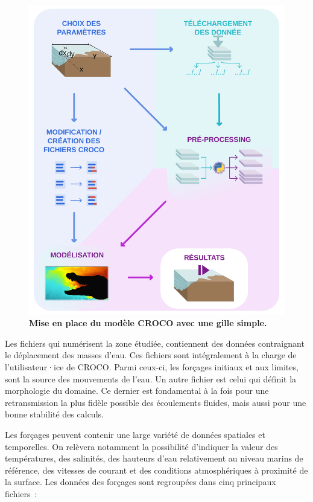 \documentclass[10pt,a4paper,titlepage]{article}
\begin{document}
\begin{figure}[h!]
    \centering
    \includegraphics[scale=0.35]{../images/workflow/mise_en_place_generale_croco.pdf}
    \caption{\textbf{Mise en place du modèle CROCO avec une gille simple.}}
    \label{fig:workflow_simple}
\end{figure}

Les fichiers qui numérisent la zone étudiée, contiennent des données contraignant le déplacement des masses d'eau.
Ces fichiers sont intégralement à la charge de l'utilisateur·ice de CROCO.
Parmi ceux-ci, les forçages initiaux et aux limites, sont la source des mouvements de l'eau. Un autre fichier est celui qui définit la morphologie du domaine. Ce dernier est fondamental à la fois pour une retransmission la plus fidèle possible des écoulements fluides, mais aussi pour une bonne stabilité des calculs.

Les forçages peuvent contenir une large variété de données spatiales et temporelles.
On relèvera notamment la possibilité d'indiquer la valeur des températures, des salinités, des hauteurs d'eau relativement au niveau marins de référence, des vitesses de courant et des conditions atmosphériques à proximité de la surface.
Les données des forçages sont regroupées dans cinq principaux fichiers~:
\end{document}
